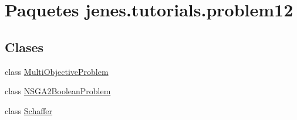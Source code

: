 \hypertarget{namespacejenes_1_1tutorials_1_1problem12}{\section{Paquetes jenes.\-tutorials.\-problem12}
\label{namespacejenes_1_1tutorials_1_1problem12}
}
\subsection*{Clases}
\begin{DoxyCompactItemize}
\item 
class \hyperlink{classjenes_1_1tutorials_1_1problem12_1_1_multi_objective_problem}{Multi\-Objective\-Problem}
\item 
class \hyperlink{classjenes_1_1tutorials_1_1problem12_1_1_n_s_g_a2_boolean_problem}{N\-S\-G\-A2\-Boolean\-Problem}
\item 
class \hyperlink{classjenes_1_1tutorials_1_1problem12_1_1_schaffer}{Schaffer}
\end{DoxyCompactItemize}
